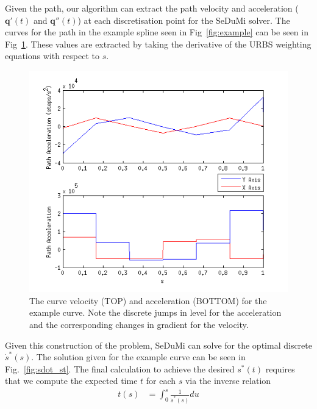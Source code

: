 Given the path, our algorithm can extract the path velocity and acceleration ($\textbf{q}'(t)$ and $\textbf{q}''(t)$) at each discretisation point for the SeDuMi solver. The curves for the path in the example spline seen in Fig~\ref{fig:example} can be seen in Fig~\ref{fig:xy_dds_ds}. These values are extracted by taking the derivative of the URBS weighting equations with respect to $s$.

\begin{figure}  
\includegraphics[width=\textwidth]{figures/optimisation/xy_dds_ds.png}
\caption[Indexed curve velocity and acceleration]{
The curve velocity (TOP) and acceleration (BOTTOM) for the example curve. Note the discrete jumps in level for the acceleration and the corresponding changes in gradient for the velocity.
\label{fig:xy_dds_ds}}
\end{figure}

Given this construction of the problem, SeDuMi can solve for the optimal discrete $\dot{s}^*(s)$. The solution given for the example curve can be seen in Fig.~\ref{fig:sdot_st}.
The final calculation to achieve the desired $s^*(t)$ requires that we compute the expected time $t$ for each $s$ via the inverse relation
\begin{align*}
t(s) &= \int_0^s\frac{1}{\dot{s}^*(s)}du\\ 
\end{align*}

